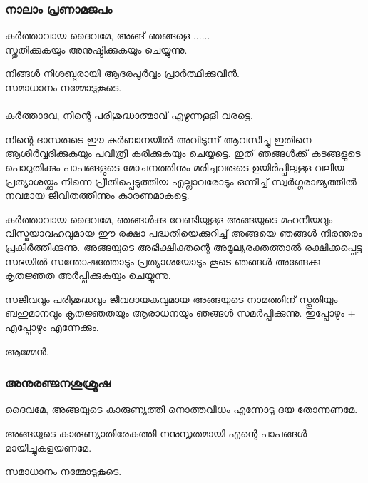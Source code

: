 \documentclass[20pt]{beamer}
\newcommand{\Priest}[1]{\color{white}#1}
\newcommand{\People}[1]{\color{yellow}#1}
\newcommand{\Server}[1]{\color{lightgray}#1}
\newcommand{\Ammen}{\People{ആമ്മേന്‍.}}
\newcommand{\Peace}{\Server{സമാധാനം നമ്മോടുകൂടെ.}}
\begin{document}
\begin{frame}[allowframebreaks]
\frametitle{നാലാം പ്രണാമജപം}
\Priest{
കര്‍ത്താവായ ദൈവമേ, അങ്ങ് ഞങ്ങളെ
......\\
സ്തുതിക്കുകയും അനുഷ്ടിക്കുകയും ചെയ്യുന്നു.}
\end{frame}

\begin{frame}
\Server{നിങ്ങള്‍ നിശബ്ദരായി ആദരപൂര്‍വ്വം പ്രാര്‍ത്ഥിക്കുവിന്‍.}\\ \Peace \\~\\
\Priest{കര്‍ത്താവേ, നിന്റെ പരിശുദ്ധാത്മാവ് എഴുന്നള്ളി വരട്ടെ.}
\end{frame}

\begin{frame}
\Priest{
നിന്റെ ദാസരുടെ ഈ കുര്‍ബാനയില്‍ അവിടുന്ന് ആവസിച്ചു ഇതിനെ 
ആശീര്‍വ്വദിക്കുകയും പവിത്രീ കരിക്കുകയും ചെയ്യട്ടെ. ഇത് ഞങ്ങള്‍ക്ക് 
കടങ്ങളുടെ പൊറുതിക്കും പാപങ്ങളുടെ മോചനത്തിനും മരിച്ചവരുടെ 
ഉയിര്‍പ്പിലുള്ള വലിയ പ്രത്യാശയ്ക്കും നിന്നെ പ്രീതിപ്പെടുത്തിയ എല്ലാവരോടും 
ഒന്നിച്ച് സ്വര്‍ഗ്ഗരാജ്യത്തില്‍ നവമായ ജീവിതത്തിന്നും കാരണമാകട്ടെ.}
\end{frame}

\begin{frame}
\Priest{
കര്‍ത്താവായ ദൈവമേ, ഞങ്ങള്‍ക്കു വേണ്ടിയുള്ള അങ്ങയുടെ മഹനീയവും 
വിസ്മയാവഹവുമായ ഈ രക്ഷാ പദ്ധതിയെക്കുറിച്ച് അങ്ങയെ ഞങ്ങള്‍ നിരന്തരം 
പ്രകീര്‍ത്തിക്കുന്നു. അങ്ങയുടെ അഭിക്ഷിക്തന്റെ അമൂല്യരക്തത്താല്‍ രക്ഷിക്കപ്പെട്ട 
സഭയില്‍ സന്തോഷത്തോടും പ്രത്യാശയോടും കൂടെ ഞങ്ങള്‍ അങ്ങേക്കു 
കൃതജ്ഞത അര്‍പ്പിക്കുകയും ചെയ്യുന്നു.}
\end{frame}

\begin{frame}
\Priest{
സജീവവും പരിശുദ്ധവും ജീവദായകവുമായ അങ്ങയുടെ നാമത്തിന് 
സ്തുതിയും ബഹുമാനവും കൃതജ്ഞതയും ആരാധനയും ഞങ്ങള്‍ സമര്‍പ്പിക്കുന്നു.
ഇപ്പോഴും + എപ്പോഴും എന്നേക്കും.}\par \Ammen
\end{frame}

\begin{frame}
\frametitle{അനുരഞ്ജനശുശ്രൂഷ}
\Priest{ദൈവമേ, അങ്ങയുടെ കാരുണ്യത്തി നൊത്തവിധം എന്നോടു ദയ തോന്നണമേ.}\par
\People{അങ്ങയുടെ കാരുണ്യാതിരേകത്തി നനുസൃതമായി എന്റെ പാപങ്ങള്‍ മായിച്ചുകളയണമേ.}
\end{frame}

\begin{frame}
\Peace
\end{frame}
\end{document}
